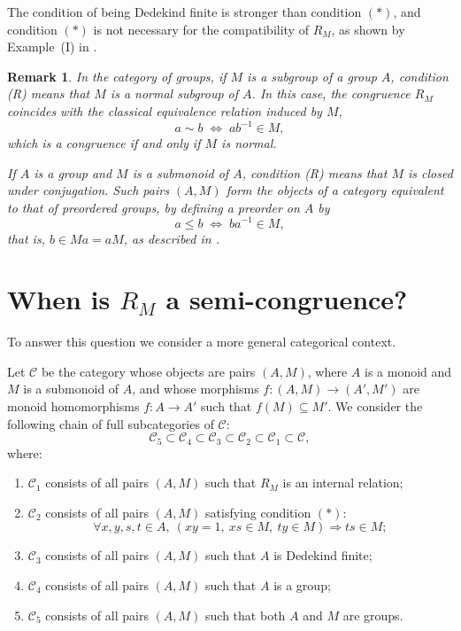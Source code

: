 \documentclass[12pt]{article}
\newtheorem{remark}{Remark}
\begin{document}
The condition of being Dedekind finite is stronger than condition $(*)$, and condition $(*)$ is not necessary for the compatibility of $R_M$, as shown by Example~(I) in \cite{MFS3}.

\begin{remark}\em
In the category of groups, if $M$ is a subgroup of a group $A$, condition (R) means that $M$ is a normal subgroup of $A$. In this case, the congruence $R_M$ coincides with the classical equivalence relation induced by $M$,
\[
a\sim b \;\Leftrightarrow\; ab^{-1}\in M,
\]
which is a congruence if and only if $M$ is normal.

If $A$ is a group and $M$ is a submonoid of $A$, condition (R) means that $M$ is closed under conjugation. Such pairs $(A,M)$ form the objects of a category equivalent to that of preordered groups, by defining a preorder on $A$ by
\[
a\leq b \;\Leftrightarrow\; ba^{-1}\in M,
\]
that is, $b\in Ma=aM$, as described in \cite{CMFM}.
\end{remark}


\section{When is $R_M$ a semi-congruence?}

To answer this question we consider a more general categorical context.

Let $\mathcal{C}$ be the category whose objects are pairs $(A,M)$, where $A$ is a monoid and $M$ is a submonoid of $A$, and whose morphisms
$f\colon (A,M)\to (A',M')$ are monoid homomorphisms $f\colon A\to A'$ such that $f(M)\subseteq M'$. We consider the following chain of full subcategories of $\mathcal{C}$:
\begin{equation}
\mathcal{C}_5 \subset \mathcal{C}_4 \subset \mathcal{C}_3 \subset \mathcal{C}_2 \subset \mathcal{C}_1 \subset \mathcal{C},
\end{equation}
where:
\begin{enumerate}
\item $\mathcal{C}_1$ consists of all pairs $(A,M)$ such that $R_M$ is an internal relation;
\item $\mathcal{C}_2$ consists of all pairs $(A,M)$ satisfying condition $(*)$:
\[
\forall x,y,s,t\in A,\ (xy=1,\ xs\in M,\ ty\in M)\Rightarrow ts\in M;
\]
\item $\mathcal{C}_3$ consists of all pairs $(A,M)$ such that $A$ is Dedekind finite;
\item $\mathcal{C}_4$ consists of all pairs $(A,M)$ such that $A$ is a group;
\item $\mathcal{C}_5$ consists of all pairs $(A,M)$ such that both $A$ and $M$ are groups.
\end{enumerate}
\end{document}
